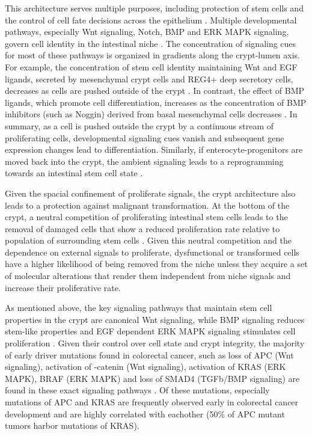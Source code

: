 \begin{flushleft}
This architecture serves multiple purposes, including protection of stem cells and the control of cell fate decisions across the epithelium \cite{cleversIntestinalCryptPrototype2013a}. Multiple developmental pathways, especially Wnt signaling, Notch, BMP and ERK MAPK signaling, govern cell identity in the intestinal niche \cite{Gehart2019}. The concentration of signaling cues for most of these pathways is organized in gradients along the crypt-lumen axis. For example, the concentration of stem cell identity maintaining Wnt and EGF ligands, secreted by mesenchymal crypt cells and REG4+ deep secretory cells, decreases as cells are pushed outside of the crypt  \cite{Sasaki2016}. In contrast, the effect of BMP ligands, which promote cell differentiation, increases as the concentration of BMP inhibitors (such as Noggin) derived from basal mesenchymal cells decreases \cite{heBMPSignalingInhibits2004}. In summary, as a cell is pushed outside the crypt by a continuous stream of proliferating cells, developmental signaling cues vanish and subsequent gene expression changes lead to differentiation. Similarly, if enterocyte-progenitors are moved back into the crypt, the ambient signaling leads to a reprogramming towards an intestinal stem cell state \cite{tettehReplacementLostLgr5Positive2016a}.\par

Given the spacial confinement of proliferate signals, the crypt architecture also leads to a protection against malignant transformation. At the bottom of the crypt, a neutral competition of proliferating intestinal stem cells leads to the removal of damaged cells that show a reduced proliferation rate relative to population of surrounding stem cells \cite{snippertIntestinalCryptHomeostasis2010a}. Given this neutral competition and the dependence on external signals to proliferate, dysfunctional or transformed cells have a higher likelihood of being removed from the niche unless they acquire a set of molecular alterations that render them independent from niche signals and increase their proliferative rate. \par

As mentioned above, the key signaling pathways that maintain stem cell properties in the crypt are canonical Wnt signaling, while BMP signaling reduces stem-like properties and EGF dependent ERK MAPK signaling stimulates cell proliferation \cite{cleversIntestinalCryptPrototype2013a}. Given their control over cell state and crypt integrity, the majority of early driver mutations found in colorectal cancer, such as loss of APC (Wnt signaling), activation of \textbeta-catenin (Wnt signaling), activation of KRAS (ERK MAPK), BRAF (ERK MAPK) and loss of SMAD4 (TGFb/BMP signaling) are found in these exact signaling pathways \cite{fearonMolecularGeneticsColorectal2011}. Of these mutations, especially mutations of APC and KRAS are frequently observed early in colorectal cancer development and are highly correlated with eachother (50\% of APC mutant tumors harbor mutations of KRAS). \par


\end{flushleft}
